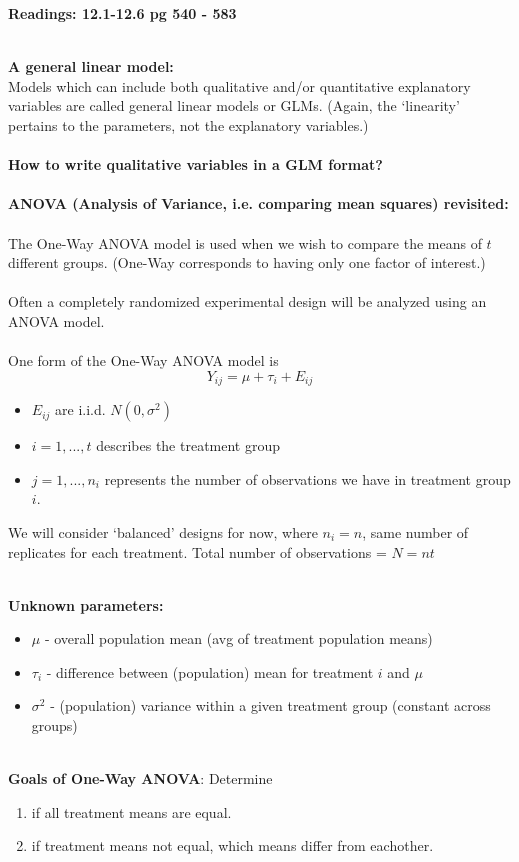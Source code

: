 \begin{center}\large\textbf{Readings: 12.1-12.6 pg 540 - 583}\\
\normalsize \end{center}
\large \hlinewd{2pt}
~\\\textbf{A general linear model:}\\
Models which can include both qualitative and/or quantitative explanatory variables are called general linear models or GLMs.  (Again, the `linearity' pertains to the parameters, not the explanatory variables.)\\~\\

\textbf{How to write qualitative variables in a GLM format?}\\~\\
\textbf{ANOVA (Analysis of Variance, i.e. comparing mean squares) revisited:}\label{ANOVAreview}\\~\\
The One-Way ANOVA model is used when we wish to compare the means of $t$ different groups.  (One-Way corresponds to having only one factor of interest.)\\~\\
Often a completely randomized experimental design will be analyzed using an ANOVA model.  \\~\\
One form of the One-Way ANOVA model is
$$Y_{ij}=\mu+\tau_i+E_{ij}$$
\begin{itemize}
\item $E_{ij}$ are i.i.d. $N(0,\sigma^2)$\
\item $i=1,...,t$ describes the treatment group
\item $j=1,...,n_i$ represents the number of observations we have in treatment group $i$. 
\end{itemize}
We will consider `balanced' designs for now, where $n_i=n$, same number of replicates for each treatment.  Total number of observations = $N = nt$\\~\\

\newpage

\textbf{Unknown parameters:}
\begin{itemize}
\item $\mu$ - overall population mean (avg of treatment population means)
\item $\tau_i$ - difference between (population) mean for treatment $i$ and $\mu$
\item $\sigma^2$ - (population) variance within a given treatment group (constant across groups)
\end{itemize}
~\\
\textbf{Goals of One-Way ANOVA}: Determine
\begin{enumerate}
\item if all treatment means are equal.
\item if treatment means not equal, which means differ from eachother.
\end{enumerate}
~\\

